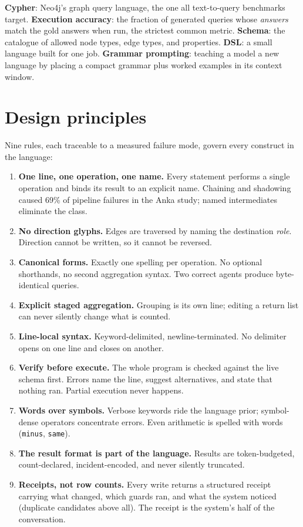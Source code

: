 \documentclass[11pt]{article}
\begin{document}
\begin{glossbox}
\textbf{Cypher}: Neo4j's graph query language, the one all text-to-query benchmarks target. \textbf{Execution accuracy}: the fraction of generated queries whose \emph{answers} match the gold answers when run, the strictest common metric. \textbf{Schema}: the catalogue of allowed node types, edge types, and properties. \textbf{DSL}: a small language built for one job. \textbf{Grammar prompting}: teaching a model a new language by placing a compact grammar plus worked examples in its context window.
\end{glossbox}

\section{Design principles}

Nine rules, each traceable to a measured failure mode, govern every construct in the language:

\begin{enumerate}[leftmargin=1.6em,itemsep=2pt]
  \item \textbf{One line, one operation, one name.} Every statement performs a single operation and binds its result to an explicit name. Chaining and shadowing caused 69\% of pipeline failures in the Anka study; named intermediates eliminate the class.
  \item \textbf{No direction glyphs.} Edges are traversed by naming the destination \emph{role}. Direction cannot be written, so it cannot be reversed.
  \item \textbf{Canonical forms.} Exactly one spelling per operation. No optional shorthands, no second aggregation syntax. Two correct agents produce byte-identical queries.
  \item \textbf{Explicit staged aggregation.} Grouping is its own line; editing a return list can never silently change what is counted.
  \item \textbf{Line-local syntax.} Keyword-delimited, newline-terminated. No delimiter opens on one line and closes on another.
  \item \textbf{Verify before execute.} The whole program is checked against the live schema first. Errors name the line, suggest alternatives, and state that nothing ran. Partial execution never happens.
  \item \textbf{Words over symbols.} Verbose keywords ride the language prior; symbol-dense operators concentrate errors. Even arithmetic is spelled with words (\texttt{minus}, \texttt{same}).
  \item \textbf{The result format is part of the language.} Results are token-budgeted, count-declared, incident-encoded, and never silently truncated.
  \item \textbf{Receipts, not row counts.} Every write returns a structured receipt carrying what changed, which guards ran, and what the system noticed (duplicate candidates above all). The receipt is the system's half of the conversation.
\end{enumerate}
\end{document}
